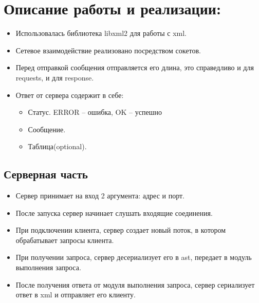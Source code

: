 \documentclass[12pt,onecolumn]{article}
\begin{document}
\section{Описание работы и реализации:}
\begin{itemize}
  \item Использовалась библиотека libxml2 для работы с xml.
  \item Сетевое взаимодействие реализовано посредством сокетов.
  \item Перед отправкой сообщения отправляется его длина, это справедливо и для requests, и для response.
  \item Ответ от сервера содержит в себе:
  \begin{itemize}
    \item Статус. ERROR – ошибка, OK – успешно
    \item Сообщение.
    \item Таблица(optional).
  \end{itemize}
\end{itemize}

\subsection{Серверная часть}
\begin{itemize}
  \item Сервер принимает на вход 2 аргумента: адрес и порт.
  \item После запуска сервер начинает слушать входящие соединения.
  \item При подключении клиента, сервер создает новый поток, в котором обрабатывает запросы клиента.
  \item При получении запроса, сервер десериализует его в ast, передает в модуль выполнения запроса.
  \item После получения ответа от модуля выполнения запроса, сервер сериализует ответ в xml и отправляет его клиенту.
\end{itemize}
\end{document}
